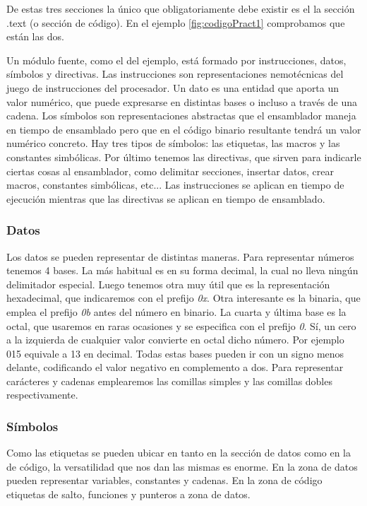 De estas tres secciones la único que obligatoriamente debe existir es
el la sección .text (o sección de código). En el ejemplo \ref{fig:codigoPract1}
comprobamos que están las dos.

Un módulo fuente, como el del ejemplo, está formado por instrucciones,
datos, símbolos y directivas. 
Las instrucciones son representaciones nemotécnicas del juego
de instrucciones del procesador. Un dato es una entidad que aporta un valor
numérico, que puede expresarse en distintas bases o incluso a través de una cadena.
Los símbolos son representaciones abstractas que el ensamblador maneja en tiempo
de ensamblado pero que en el código binario resultante tendrá un valor numérico
concreto. Hay tres tipos de símbolos: las etiquetas, las macros y las constantes simbólicas.
Por último tenemos las directivas, que sirven para indicarle ciertas cosas al
ensamblador, como delimitar secciones, insertar datos, crear macros, constantes
simbólicas, etc... Las instrucciones se aplican en tiempo de ejecución
mientras que las directivas se aplican en tiempo de ensamblado.

\subsubsection{Datos}

Los datos se pueden representar de distintas maneras. Para representar números tenemos
4 bases. La más habitual es en su forma decimal, la cual no lleva ningún delimitador
especial. Luego tenemos otra muy útil que es la representación hexadecimal, que
indicaremos con el prefijo {\it 0x}. Otra interesante es la binaria, que emplea el
prefijo {\it 0b} antes del número en binario. La cuarta y última base es la
octal, que usaremos en raras ocasiones y se especifica con el prefijo {\it 0}. Sí, un
cero a la izquierda de cualquier valor convierte en octal dicho número. Por ejemplo
015 equivale a 13 en decimal. Todas estas bases pueden ir con un signo menos delante,
codificando el valor negativo en complemento a dos. Para representar carácteres y cadenas
emplearemos las comillas simples y las comillas dobles respectivamente.

\subsubsection{Símbolos}

Como las etiquetas se pueden ubicar en tanto en la sección de datos como en la de código,
la versatilidad que nos dan las mismas es enorme. En la zona de datos pueden representar
variables, constantes y cadenas. En la zona de código etiquetas de salto, funciones y
punteros a zona de datos.

